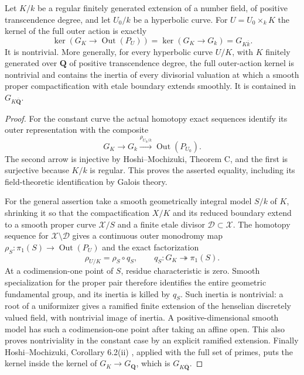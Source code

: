 \begin{proposition}
\label{A:constant-kernel}
Let $K/k$ be a regular finitely generated extension of a number
field, of positive transcendence degree, and let $U_0/k$ be a
hyperbolic curve. For $U=U_0\times_k K$ the kernel of the full
outer action is exactly
\[
 \ker(G_K\to\operatorname{Out}(P_U))
       =\ker(G_K\to G_k)=G_{K\overline k}.
\]
It is nontrivial. More generally, for every hyperbolic curve
$U/K$, with $K$ finitely generated over $\mathbf Q$ of positive
transcendence degree, the full outer-action kernel is nontrivial
and contains the inertia of every divisorial valuation at which
a smooth proper compactification with etale boundary extends
smoothly. It is contained in $G_{K\overline{\mathbf Q}}$.
\end{proposition}
\begin{proof}
For the constant curve the actual homotopy exact sequences
identify its outer representation with the composite
\[
 G_K\longrightarrow G_k\xrightarrow{\rho_{U_0/k}}
                  \operatorname{Out}(P_{U_0}).
\]
The second arrow is injective by Hoshi--Mochizuki, Theorem C,
and the first is surjective because $K/k$ is regular. This
proves the asserted equality, including its field-theoretic
identification by Galois theory.

For the general assertion take a smooth geometrically integral
model $S/k$ of $K$, shrinking it so that the compactification
$X/K$ and its reduced boundary extend to a smooth proper
curve $\mathcal X/S$ and a finite etale divisor
$\mathcal D\subset\mathcal X$. The homotopy sequence for
$\mathcal X\setminus\mathcal D$ gives a continuous outer
monodromy map $\rho_S:\pi_1(S)\to\operatorname{Out}(P_U)$
and the exact factorization
\[
          \rho_{U/K}=\rho_S\circ q_S,
       \qquad q_S:G_K\twoheadrightarrow\pi_1(S).
\]
At a codimension-one point of $S$, residue characteristic is
zero. Smooth specialization for the proper pair therefore
identifies the entire geometric fundamental group, and its
inertia is killed by $q_S$. Such inertia is nontrivial:
a root of a uniformizer gives a ramified finite extension of
the henselian discretely valued field, with nontrivial image
of inertia. A positive-dimensional smooth model has such a
codimension-one point after taking an affine open. This also
proves nontriviality in the constant case by an explicit
ramified extension. Finally Hoshi--Mochizuki, Corollary 6.2(ii)
\cite{A_HoshiMochizuki2011}, applied with the full set of primes,
puts the kernel inside the kernel of $G_K\to G_{\mathbf Q}$,
which is $G_{K\overline{\mathbf Q}}$.
\end{proof}

